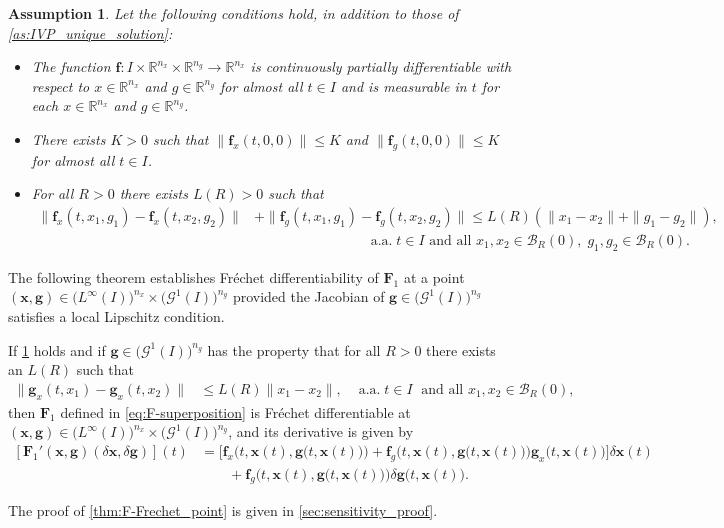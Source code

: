 \documentclass[onefignum,onetabnum]{siamart220329}
\numberwithin{equation}{section}
\newcommand{\aall}{\mbox{ a.a.} \;}
\newcommand {\real} {\mathbb{R}}
\newcommand{\bff}{\ensuremath{\mathbf{f}}} %
\newcommand{\bg}{\ensuremath{\mathbf{g}}} %
\newcommand{\bx}{\ensuremath{\mathbf{x}}} %
\newcommand{\BF}{\ensuremath{\mathbf{F}} } %
\newcommand {\cB} {\mathcal{B}}
\newcommand {\cG} {\mathcal{G}}
\newcommand{\LL}{\big(L^\infty(I) \big)^{n_x}}
\newtheorem{assumption}[theorem]{Assumption}
\begin{document}
\begin{assumption} \label{as:assumption1}
   Let the following conditions hold, in addition to those of \cref{as:IVP_unique_solution}:
   \begin{itemize}   
   \item[(i)]   The function $\bff : I \times \real^{n_x} \times \real^{n_g} \rightarrow \real^{n_x}$ 
                   is continuously partially differentiable with respect to $x \in \real^{n_x}$ and $g  \in \real^{n_g}$ for almost all $t \in I$ and
                   is measurable in $t$ for each $x \in \real^{n_x}$ and $g  \in \real^{n_g}$.
                   
   \item[(ii)]   There exists $K > 0$ such that $ \| \bff_x( t, 0, 0 )  \| \le K$ and 
                    $ \| \bff_g( t, 0, 0 )  \| \le K$  for almost all $t \in I$.
                   
   \item[(iii)]    For all $R > 0$ there exists $L(R) > 0$ such that
    \begin{align*}   
    	\| \bff_x(t, x_1, g_1) - \bff_x(t, x_2, g_2) \| &+ \| \bff_g(t, x_1, g_1) - \bff_g(t, x_2, g_2) \|
          \leq L(R) ( \| x_1 - x_2 \| + \| g_1 - g_2 \| ), \\
          &\qquad\qquad\qquad\qquad  \aall  t \in I  \mbox{ and all } x_1, x_2 \in \cB_R(0), \; g_1, g_2 \in \cB_R(0).
    \end{align*}
    \end{itemize}
\end{assumption}

The following theorem establishes Fr\'echet differentiability of $\BF_1$ at a point $(\bx, \bg) \in \LL \times \big(\cG^1(I)\big)^{n_g}$ 
provided the Jacobian of $\bg \in \big(\cG^1(I)\big)^{n_g}$ satisfies a local Lipschitz condition.

\begin{theorem} \label{thm:F-Frechet_point}
    If \cref{as:assumption1} holds and if 
    $\bg \in \big(\cG^1(I)\big)^{n_g}$ has the property that for all $R > 0$ there exists an $L(R)$ such that
    \begin{align}  \label{eq:Lipschitz_g_x_local}
    		\| \bg_x(t, x_1) - \bg_x(t, x_2) \| &\leq L(R) \| x_1 - x_2 \|,  
		& \aall t \in I \;   \mbox{ and all }  x_1, x_2 \in \cB_R(0), 
    \end{align}
    then $\BF_1$ defined in \cref{eq:F-superposition} is Fr\'echet differentiable at $(\bx, \bg) \in \LL \times \big(\cG^1(I)\big)^{n_g}$, and its derivative is given by
    \begin{align}  \label{eq:F-Frechet_deriv}
      	[\BF_1'(\bx, \bg) (\delta \bx, \delta \bg)](t) 
	&= \Big[ \bff_x\Big( t, \bx(t), \bg\big(t, \bx(t) \big) \Big) 
	              + \bff_g\Big( t, \bx(t), \bg\big(t, \bx(t) \big) \Big) \bg_x\big(t, \bx(t) \big) \Big] \delta \bx(t)    \nonumber \\ 
	 &\qquad + \bff_g\Big( t, \bx(t), \bg\big( t,  \bx(t) \big) \Big) \delta \bg\big(t,  \bx(t) \big).
    \end{align}
\end{theorem}
The proof of \cref{thm:F-Frechet_point} is given in \cref{sec:sensitivity_proof}.
    
\end{document}
